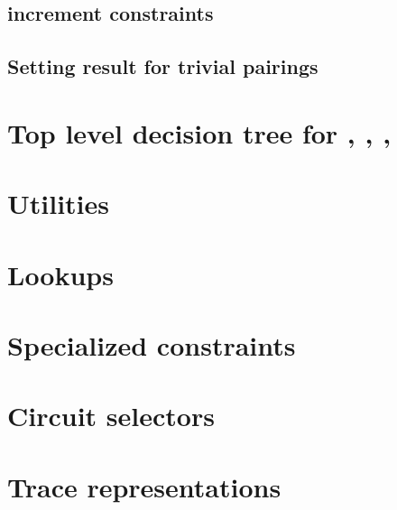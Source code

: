 \subsection{\blsId{} increment constraints}                                 \label{bls: stamp increments}                                   
\subsection{Setting result for trivial pairings}                            \label{bls: trivial result}                                     

\section{Top level decision tree for \malformedDataInternalTot{}, \malformedDataExternalTot{}, \wellformedDataTrivial{}, \wellformedDataNontrivial{}}     \label{bls: top level}                                          


\section{Utilities}                       \label{bls: utilities}                       
\section{Lookups}                         \label{bls: lookups}                         
\section{Specialized constraints}         \label{bls: specialized constraints}         
\section{Circuit selectors}               \label{bls: circuit selectors}               
\section{Trace representations}           \label{bls: trace representations}           
